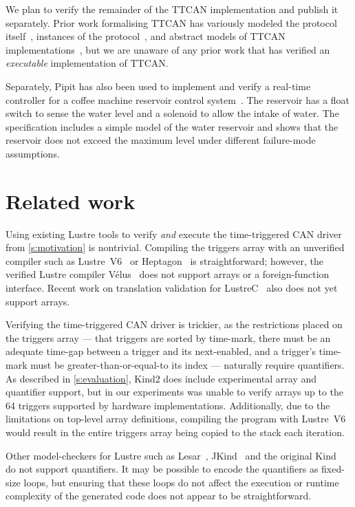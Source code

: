\documentclass[a4paper,UKenglish,cleveref, autoref, thm-restate,anonymous]{lipics-v2021}
\begin{document}
We plan to verify the remainder of the TTCAN implementation and publish it separately.
Prior work formalising TTCAN has variously modeled the protocol itself~\cite{saha2007finite, pan2014modeling,li2018formal},
instances of the protocol~\cite{guo2020model},
and abstract models of TTCAN implementations~\cite{leen2006modeling}, but we are unaware of any prior work that has verified an \emph{executable} implementation of TTCAN.

Separately, Pipit has also been used to implement and verify a real-time controller for a coffee machine reservoir control system~\cite{robinson2023pipit}.
The reservoir has a float switch to sense the water level and a solenoid to allow the intake of water.
The specification includes a simple model of the water reservoir and shows that the reservoir does not exceed the maximum level under different failure-mode assumptions.
 

\section{Related work}
\label{s:related-work}



Using existing Lustre tools to verify \emph{and} execute the time-triggered CAN driver from \autoref{s:motivation} is nontrivial.
Compiling the triggers array with an unverified compiler such as Lustre~V6~\cite{jahier2016lustre} or Heptagon~\cite{gerard2012modular} is straightforward; however, the verified Lustre compiler Vélus~\cite{bourke2023verified} does not support arrays or a foreign-function interface.
Recent work on translation validation for LustreC~\cite{brun2023equation} also does not yet support arrays.

Verifying the time-triggered CAN driver is trickier, as the restrictions placed on the triggers array --- that triggers are sorted by time-mark, there must be an adequate time-gap between a trigger and its next-enabled, and a trigger's time-mark must be greater-than-or-equal-to its index --- naturally require quantifiers.
As described in \autoref{s:evaluation}, Kind2 does include experimental array and quantifier support, but in our experiments was unable to verify arrays up to the 64 triggers supported by hardware implementations.
Additionally, due to the limitations on top-level array definitions, compiling the program with Lustre~V6 would result in the entire triggers array being copied to the stack each iteration.

Other model-checkers for Lustre such as Lesar~\cite{raymond2008synchronous}, JKind~\cite{gacek2018jkind} and the original Kind~\cite{hagen2008scaling} do not support quantifiers.
It may be possible to encode the quantifiers as fixed-size loops, but ensuring that these loops do not affect the execution or runtime complexity of the generated code does not appear to be straightforward.
\end{document}
